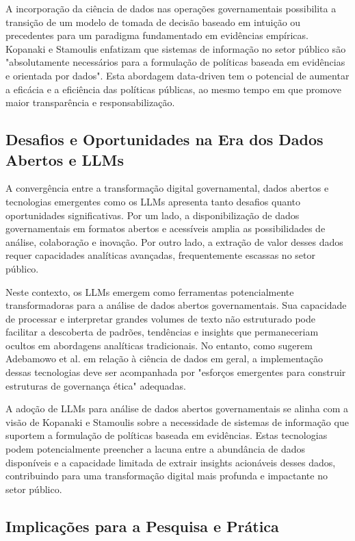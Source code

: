 A incorporação da ciência de dados nas operações governamentais possibilita a transição de um modelo de tomada de decisão baseado em intuição ou precedentes para um paradigma fundamentado em evidências empíricas. Kopanaki e Stamoulis \cite{ref_131} enfatizam que sistemas de informação no setor público são "absolutamente necessários para a formulação de políticas baseada em evidências e orientada por dados". Esta abordagem data-driven tem o potencial de aumentar a eficácia e a eficiência das políticas públicas, ao mesmo tempo em que promove maior transparência e responsabilização.

\subsection{Desafios e Oportunidades na Era dos Dados Abertos e LLMs}

A convergência entre a transformação digital governamental, dados abertos e tecnologias emergentes como os LLMs apresenta tanto desafios quanto oportunidades significativas. Por um lado, a disponibilização de dados governamentais em formatos abertos e acessíveis amplia as possibilidades de análise, colaboração e inovação. Por outro lado, a extração de valor desses dados requer capacidades analíticas avançadas, frequentemente escassas no setor público.

Neste contexto, os LLMs emergem como ferramentas potencialmente transformadoras para a análise de dados abertos governamentais. Sua capacidade de processar e interpretar grandes volumes de texto não estruturado pode facilitar a descoberta de padrões, tendências e insights que permaneceriam ocultos em abordagens analíticas tradicionais. No entanto, como sugerem Adebamowo et al. \cite{Adebamowo2023} em relação à ciência de dados em geral, a implementação dessas tecnologias deve ser acompanhada por "esforços emergentes para construir estruturas de governança ética" adequadas.

A adoção de LLMs para análise de dados abertos governamentais se alinha com a visão de Kopanaki e Stamoulis \cite{ref_131} sobre a necessidade de sistemas de informação que suportem a formulação de políticas baseada em evidências. Estas tecnologias podem potencialmente preencher a lacuna entre a abundância de dados disponíveis e a capacidade limitada de extrair insights acionáveis desses dados, contribuindo para uma transformação digital mais profunda e impactante no setor público.

\subsection{Implicações para a Pesquisa e Prática}

